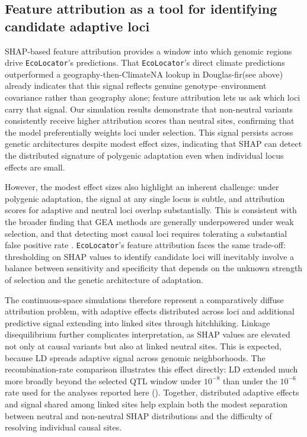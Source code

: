 \documentclass[]{article}
\newcommand{\dfir}{Douglas-fir\xspace}
\newcommand{\ecolocator}{\texttt{EcoLocator}\xspace}
\begin{document}
\subsection{Feature attribution as a tool for identifying candidate adaptive loci}

SHAP-based feature attribution provides a window
into which genomic regions drive \ecolocator's predictions. That
\ecolocator's direct climate predictions outperformed a
geography-then-ClimateNA lookup in \dfir (see above) already indicates
that this signal reflects genuine genotype--environment covariance
rather than geography alone; feature attribution lets us ask which
loci carry that signal. Our simulation results demonstrate
that non-neutral variants consistently receive
higher attribution scores than neutral sites,
confirming that the model preferentially weights loci
under selection.
This signal persists across genetic architectures
despite modest effect sizes,
indicating that SHAP can detect the distributed signature
of polygenic adaptation
even when individual locus effects are small.

However,
the modest effect sizes also highlight
an inherent challenge:
under polygenic adaptation,
the signal at any single locus is subtle,
and attribution scores for adaptive and neutral loci
overlap substantially.
This is consistent with the broader finding
that GEA methods are generally underpowered
under weak selection,
and that detecting most causal loci
requires tolerating a substantial false positive rate
\citep{lotterhos_whitlock_2015, booker_wza_2024}.
\ecolocator's feature attribution faces the same trade-off:
thresholding on SHAP values to identify candidate loci
will inevitably involve a balance
between sensitivity and specificity
that depends on the unknown strength of selection
and the genetic architecture of adaptation.

The continuous-space simulations therefore represent
a comparatively diffuse attribution problem,
with adaptive effects distributed across loci
and additional predictive signal extending into linked sites
through hitchhiking.
Linkage disequilibrium further complicates interpretation,
as SHAP values are elevated not only at causal variants
but also at linked neutral sites.
This is expected,
because LD spreads adaptive signal
across genomic neighborhoods.
The recombination-rate comparison illustrates this effect directly:
LD extended much more broadly beyond the selected QTL window
under \(10^{-8}\) than under the \(10^{-6}\) rate
used for the analyses reported here
().
Together, distributed adaptive effects and signal shared among linked sites
help explain both the modest separation between neutral
and non-neutral SHAP distributions
and the difficulty of resolving individual causal sites.
\end{document}

